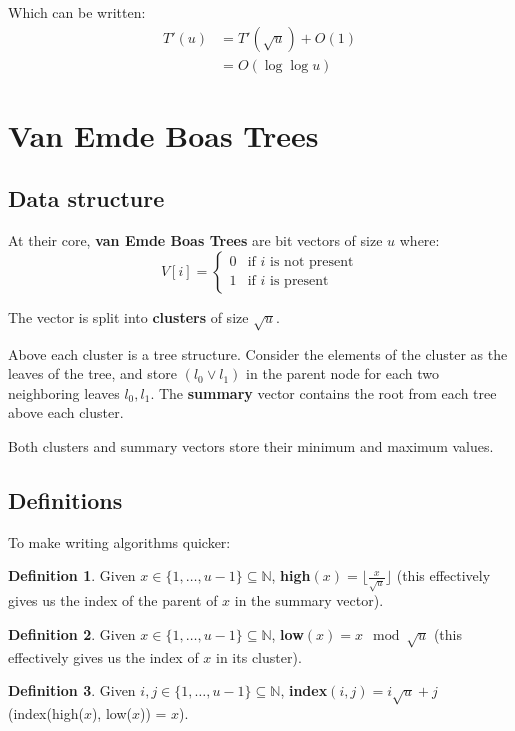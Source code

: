 \documentclass[11pt]{article}
\theoremstyle{plain}
\theoremstyle{definition}
\newtheorem*{defn}{Definition}
\newcommand{\N}{\mathbb{N}}
\begin{document}
Which can be written:
\begin{align}
    T'(u) &= T'(\sqrt u) + O(1)\\
          &= O(\log\log u)
\end{align}

\section{Van Emde Boas Trees}
\subsection{Data structure}

At their core, \textbf{van Emde Boas Trees} are bit vectors of size $u$ where:
\[
V[i] = 
    \begin{cases}
        0 & \text{if } i \text{ is not present}\\
        1 & \text{if } i \text{ is present}
    \end{cases}
\]

The vector is split into \textbf{clusters} of size $\sqrt u$.

Above each cluster is a tree structure. Consider the elements of the cluster as the
leaves of the tree, and store $(l_0 \vee l_1)$ in the parent node for each two neighboring leaves 
$l_0, l_1$. The \textbf{summary} vector contains the root from each tree above each cluster.

Both clusters and summary vectors store their minimum and maximum values.

\subsection{Definitions}

To make writing algorithms quicker:

\begin{defn}
    Given $x \in \{1, \ldots, u - 1\} \subseteq \N$, \textbf{high}$(x) = \lfloor \frac{x}{\sqrt{u}}\rfloor$
    (this effectively gives us the index of the parent of $x$ in the summary vector).
\end{defn}

\begin{defn}
    Given $x \in \{1, \ldots, u - 1\} \subseteq \N$, \textbf{low}$(x) = x \mod \sqrt{u}$
    (this effectively gives us the index of $x$ in its cluster).
\end{defn}

\begin{defn}
    Given $i, j \in \{1, \ldots, u - 1\} \subseteq \N$, \textbf{index}$(i, j) = i\sqrt{u} + j$
    (index(high($x$), low($x$)) = $x$).
\end{defn}
\end{document}
